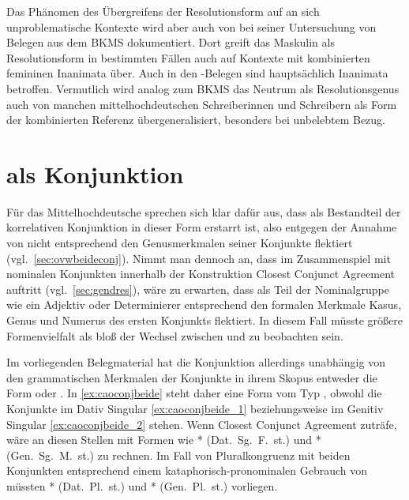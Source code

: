 Das Phänomen des Übergreifens der Resolutionsform auf an sich unproblematische
Kontexte wird aber auch von \citet[302]{corbett1991} bei seiner Untersuchung
von Belegen aus dem BKMS dokumentiert. Dort greift das Maskulin als
Resolutionsform in bestimmten Fällen auch auf Kon\-texte mit kombinierten
femininen Inanimata über. Auch in den -Belegen sind
hauptsächlich Inanimata betroffen. Vermutlich wird analog zum BKMS das Neutrum
als Resolutionsgenus auch von manchen mittelhochdeutschen Schreiberinnen und
Schreibern als Form der kombinierten Referenz übergeneralisiert, besonders bei
unbelebtem Bezug.


\section{ als Konjunktion}
\label{sec:beideconj}

Für das Mittelhochdeutsche sprechen sich \citet[626--627]{ksw2} klar dafür aus,
dass  als Bestandteil der korrelativen Konjunktion   in dieser Form erstarrt ist, also
 entgegen der Annahme von \citet{askedal1974} nicht entsprechend
den Genusmerkmalen seiner Konjunkte flektiert (vgl.~\cref{sec:ovwbeideconj}).
Nimmt man dennoch an, dass im Zusammenspiel mit nominalen Konjunkten innerhalb
der Konstruktion Closest Conjunct Agreement auftritt (vgl.~\cref{sec:gendres}),
wäre zu erwarten, dass  als Teil der Nominalgruppe wie ein Adjektiv
oder Determinierer entsprechend den formalen Merkmale Kasus, Genus und Numerus
des ersten Konjunkts flektiert. In diesem Fall müsste größere Formenvielfalt
als bloß der Wechsel zwischen  und  zu beobachten
sein.

Im vorliegenden Belegmaterial hat die Konjunktion allerdings unabhängig von den
grammatischen Merkmalen der Konjunkte in ihrem Skopus entweder die Form
 oder . In \cref{ex:caoconjbeide} steht daher eine
Form vom Typ , obwohl die Konjunkte im Dativ Singular
\cref{ex:caoconjbeide_1} beziehungsweise im Genitiv Singular
\cref{ex:caoconjbeide_2} stehen. Wenn Closest Conjunct Agreement zuträfe, wäre
an diesen Stellen mit Formen wie * (Dat.~Sg.~F.~st.) und
* (Gen.~Sg.~M.~st.) zu rechnen. Im Fall von Pluralkongruenz mit
beiden Konjunkten entsprechend einem kataphorisch-pronominalen Gebrauch von
 müssten * (Dat.~Pl.~st.) und *
(Gen.~Pl.~st.) vorliegen.


